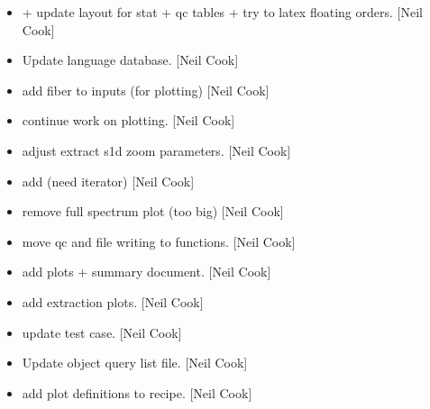 \documentclass[a4paper,10pt,english]{report}
\begin{document}
\label{\detokenize{misc/changelog:id69}}\begin{itemize}
\item {} 
 +  \sphinxhyphen{} update layout for stat + qc tables + try
to latex floating orders. {[}Neil Cook{]}

\item {} 
Update language database. {[}Neil Cook{]}

\item {} 
 \sphinxhyphen{} add fiber to  inputs (for
plotting) {[}Neil Cook{]}

\item {} 
 \sphinxhyphen{} continue work on plotting. {[}Neil Cook{]}

\item {} 
 \sphinxhyphen{} adjust extract s1d zoom
parameters. {[}Neil Cook{]}

\item {} 
 \sphinxhyphen{} add  (need iterator)
{[}Neil Cook{]}

\item {} 
 \sphinxhyphen{} remove full spectrum plot (too big) {[}Neil
Cook{]}

\item {} 
 \sphinxhyphen{} move qc and file writing to functions.
{[}Neil Cook{]}

\item {} 
 \sphinxhyphen{} add plots + summary document. {[}Neil Cook{]}

\item {} 
 \sphinxhyphen{} add extraction plots. {[}Neil Cook{]}

\item {} 
 \sphinxhyphen{} update test case. {[}Neil Cook{]}

\item {} 
Update object query list file. {[}Neil Cook{]}

\item {} 
 \sphinxhyphen{} add plot definitions
to recipe. {[}Neil Cook{]}


\end{itemize}
\end{document}
